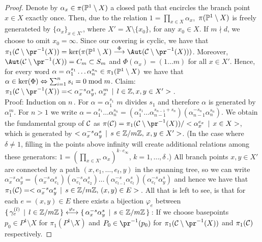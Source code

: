 \documentclass[main.tex]{subfiles}
\begin{document}
  \begin{proof}
  Denote by $\alpha_x \in \pi(\P^1 \setminus X)$ a closed path that encircles the branch point $x \in X$ exactly once. Then,  due to the relation $1 = \prod_{x \in X} \alpha_x$,\,
  $\pi(\P^1 \setminus X)$ is freely generateted by $\{ \alpha_x \}_{x \in X'}$, where $X' = X \setminus \{ x_0 \}$, for any $x_0 \in X$. If $m \nmid d$, we choose to omit $x_0 = \infty$. \abstand
  Since our covering is cyclic, we have that $
  \pi_1(\cu \setminus \pr^{-1}(X)) = \ker(\pi(\P^1 \setminus X) \overset{\Phi}{\To} \Aut(\cu \setminus \pr^{-1}(X)))$. Moreover, $\Aut(\cu \setminus \pr^{-1}(X)) = C_m 
  \subset S_m$
  and $\Phi(\alpha_x) = (1 \dots m)$ for all $x \in X'$. Hence, for every word $\alpha = \alpha_1^{s_1}\dots \alpha_n^{s_n} \in \pi_1(\P^1 \setminus X)$ we have that
  $\alpha \in \ker(\Phi) \eq \sum_{i=1}^n s_i = 0 \bmod m$. \abstand
  Claim: $\pi_1(\cu \setminus \pr^{-1}(X)) = < \alpha_x^{-s} \alpha_y^{s}, \, \alpha_x^m  \, \mid \, l \in \Z, x,y \in X' >$\,. \\
  Proof: Induction on $n$\,. For $\alpha = \alpha_1^{s_1}$ $m$ divides $s_1$ and therefore $\alpha$ is generated by $\alpha_1^m$. For $n > 1$ we write
  $\alpha = \alpha_1^{s_1}\dots \alpha_n^{s_n} = (\alpha_1^{s_1} \dots \alpha_{n-1}^{s_{n-1}+s_n})(\alpha_{n-1}^{-s_n}\alpha_n^{s_n})$. \abstand
  We obtain the fundamental group of $\cu$ as
  $\pi(\cu) = \pi_1(\cu \setminus \pr^{-1}(X)) / < \alpha_x^{e_x} \, \mid \, x \in X >$, which is generated by 
  $< \alpha_x^{-s} \alpha_y^{s} \, \mid \, s \in \Z/m\Z, \, x,y \in X' >$. (In the case where $\delta \ne 1$, filling in the points above infinity will create additional relations among 
  these generators:
  $1 = (\prod_{x \in X'} \alpha_x)^{k \cdot e_{\infty}}$, $k = 1,\dots,\delta$\,.) \abstand
  All branch points $x,y \in X'$ are connected by a path $(x,e_1,\dots,e_t,y)$ in the spanning tree, so we can write $\alpha_x^{-s} \alpha_y^{s} = (\alpha_x^{-s}\alpha_{e_1}^{s})
  (\alpha_{e_1}^{-s}\alpha_{e_2}^{s})\dots(\alpha_{e_{t-1}}^{-s}\alpha_{e_t}^{s})(\alpha_{e_t}^{-s}\alpha_y^{s})$ and hence we have that 
  $\pi_1(\cu) = < \alpha_x^{-s} \alpha_y^{s} \, \mid \, s \in \Z/m\Z, \, (x,y) \in E >$\,. \abstand
    All that is left to see, is that for each $e = (x,y) \in E$ there exists a bijection $\varphi_e$ between
  $\{ \, \gamma_e^{(l)} \, \mid \, l \in \Z/m\Z \, \} \overset{\varphi_e}{\longleftrightarrow} \{ \, \alpha_x^{-s} \alpha_y^{s} \, \mid \, s \in \Z/m\Z \, \}$\,: \abstand
  If we choose basepoints $p_0 \in P^1 \setminus X$ for $\pi_1(P^1 \setminus X)$ and $P_0 \in \pr^{-1}(p_0)$ for $\pi_1(\cu \setminus \pr^{-1}(X))$ and $\pi_1(\cu)$ respectively.

\end{proof}
\end{document}
